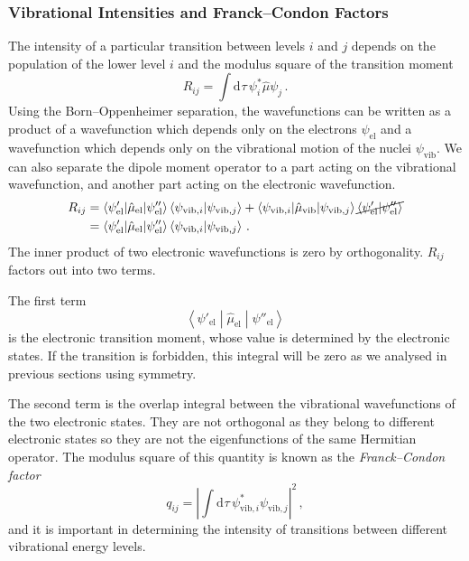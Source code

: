 \documentclass{article}
\theoremstyle{plain}\theoremheaderfont{\normalfont\itshape}\theorembodyfont{\rmfamily}\theoremseparator{.}\newtheorem*{rem}{Remark}\newtheorem*{ex}{Example}\newtheorem*{proof}{Proof}\newtheorem*{altp}{Alternative proof}
\theoremstyle{plain}\theoremheaderfont{\normalfont\bfseries}\theorembodyfont{\rmfamily}\theoremseparator{.}\newtheorem{thm}{Theorem}[section]\newtheorem{lem}[thm]{Lemma}\newtheorem{prop}[thm]{Proposition}\newtheorem*{cor}{Corollary}\newtheorem{defn}[thm]{Definition}\newtheorem{clm}[thm]{Claim}\newtheorem{clminproof}{Claim}\newtheorem{pos}{Postulate}[section]
\theoremstyle{break}\theoremheaderfont{\normalfont\itshape}\theorembodyfont{\rmfamily}\theoremseparator{.\medskip}\newtheorem*{proofskip}{Proof}\newtheorem*{exs}{Examples}\newtheorem*{rems}{Remarks}
\theoremstyle{break}\theoremheaderfont{\normalfont\bfseries}\theorembodyfont{\rmfamily}\theoremseparator{.\medskip}\newtheorem{lemskip}[thm]{Lemma}\newtheorem{defnskip}[thm]{Definition}\newtheorem{propskip}[thm]{Proposition}\newtheorem{thmskip}[thm]{Theorem}
\numberwithin{equation}{section}
\newcommand{\dd}[2][]{\mathrm{d}^{#1} #2\,}
\newcommand{\braket}[2]{\left\langle #1 \middle| #2 \right\rangle}
\newcommand{\mel}[3]{\left\langle #1 \middle| #2 \middle| #3 \right\rangle}
\newcommand{\abs}[1]{\left| #1 \right|}
\begin{document}
    \subsubsection{Vibrational Intensities and Franck--Condon Factors}
    The intensity of a particular transition between levels \(i\) and \(j\) depends on the population of the lower level \(i\) and the modulus square of the transition moment
    \begin{equation}
        R_{ij}=\int\dd{\tau}\psi_i^*\hat{\mu}\psi_j\,.
    \end{equation}
    Using the Born--Oppenheimer separation, the wavefunctions can be written as a product of a wavefunction which depends only on the electrons \(\psi_{\text{el}}\) and a wavefunction which depends only on the vibrational motion of the nuclei \(\psi_{\text{vib}}\). We can also separate the dipole moment operator to a part acting on the vibrational wavefunction, and another part acting on the electronic wavefunction.
    \begin{align}
        R_{ij}&=\mel{\psi'_{\text{el}}}{\hat{\mu}_{\text{el}}}{\psi''_{\text{el}}}\braket{\psi_{\text{vib},i}}{\psi_{\text{vib},j}}+\mel{\psi_{\text{vib},i}}{\hat{\mu}_{\text{vib}}}{\psi_{\text{vib},j}}\cancel{\braket{\psi'_{\text{el}}}{\psi''_{\text{el}}}}\notag\\
        &=\mel{\psi'_{\text{el}}}{\hat{\mu}_{\text{el}}}{\psi''_{\text{el}}}\braket{\psi_{\text{vib},i}}{\psi_{\text{vib},j}}\,.
    \end{align}
    The inner product of two electronic wavefunctions is zero by orthogonality. \(R_{ij}\) factors out into two terms.

    The first term
    \begin{equation}
        \mel{\psi'_{\text{el}}}{\hat{\mu}_{\text{el}}}{\psi''_{\text{el}}}
    \end{equation}
    is the electronic transition moment, whose value is determined by the electronic states. If the transition is forbidden, this integral will be zero as we analysed in previous sections using symmetry.

    The second term is the overlap integral between the vibrational wavefunctions of the two electronic states. They are not orthogonal as they belong to different electronic states so they are not the eigenfunctions of the same Hermitian operator. The modulus square of this quantity is known as the \textit{Franck--Condon factor}
    \begin{equation}
        q_{ij}=\abs{\int\dd{\tau}\psi_{\text{vib},i}^*\psi_{\text{vib},j}}^2\,,
    \end{equation}
    and it is important in determining the intensity of transitions between different vibrational energy levels.
\end{document}
